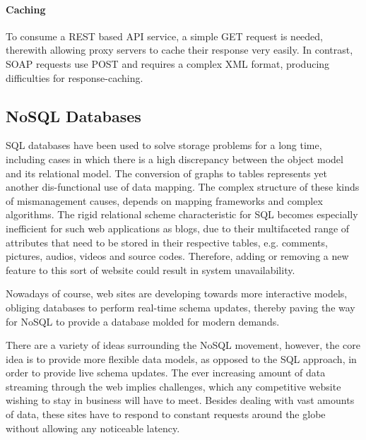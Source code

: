\paragraph{Caching}

To consume a \ac{REST} based \ac{API} service, a simple GET request is needed, therewith allowing proxy servers to cache their response very easily. In contrast, \ac{SOAP} requests use POST and requires a complex \ac{XML} format, producing difficulties for response-caching.

\subsection{NoSQL Databases \label{sec:back_da_per}}
\ac{SQL} databases have been used to solve storage problems for a long time, including cases in which there is a high discrepancy between the object model and its relational model. The conversion of graphs to tables represents yet another dis-functional use of data mapping. The complex structure of these kinds of mismanagement causes, depends on mapping frameworks and complex algorithms. The rigid relational scheme characteristic for \ac{SQL} becomes especially inefficient for such web applications as blogs, due to their multifaceted range of attributes that need to be stored in their respective tables, e.g. comments, pictures, audios, videos and source codes. Therefore, adding or removing a new feature to this sort of website could result in system unavailability.          

Nowadays of course,  web sites are developing towards more interactive models, obliging databases to perform real-time schema updates, thereby paving the way for \ac{NoSQL} to provide a database molded for modern demands. %


There are a variety of ideas surrounding the \ac{NoSQL} movement, however, the core idea is to provide more flexible data models, as opposed to the \ac{SQL} approach, in order to provide live schema updates. The ever increasing amount of data streaming through the web implies challenges, which any competitive website wishing to stay in business will have to meet. Besides dealing with vast amounts of data, these sites have to respond to constant requests around the globe without allowing any noticeable latency.

